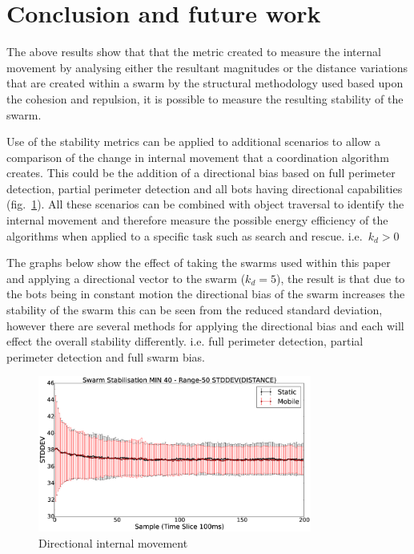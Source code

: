 \documentclass[10pt,journal,letterpaper,twoside]{IEEEtran}
\newcommand{\stability}{internal movement}
\newcommand{\Fig}{fig.}
\begin{document}
\section{Conclusion and future work\label{section:futureWork}}

The above results show that that the metric created to measure the
\stability{} by analysing either the resultant magnitudes or the
distance variations that are created within a swarm by the structural
methodology used based upon the cohesion and repulsion, it is possible
to measure the resulting stability of the swarm.

Use of the stability metrics can be applied to additional scenarios to
allow a comparison of the change in \stability{} that a coordination
algorithm creates. This could be the addition of a directional bias
based on full perimeter detection, partial perimeter detection and all
bots having directional capabilities
(\Fig{}~\ref{methods:StabilityDistanceSwarmDirection}).  All these
scenarios can be combined with object traversal to identify the
\stability{} and therefore measure the possible energy efficiency of
the algorithms when applied to a specific task such as search and
rescue. i.e.~${k_d > 0}$

The graphs below show the effect of taking the swarms used within this
paper and applying a directional vector to the swarm ($k_d = 5$), the
result is that due to the bots being in constant motion the
directional bias of the swarm increases the stability of the swarm
this can be seen from the reduced standard deviation, however there
are several methods for applying the directional bias and each will
effect the overall stability differently. i.e. full perimeter
detection, partial perimeter detection and full swarm bias.

\begin{figure}[H]
\begin{center}
\includegraphics[width=9cm]{figures/StabilityDistanceSwarmDirection}
\end{center}
\caption{Directional \stability{}\label{methods:StabilityDistanceSwarmDirection}}
\end{figure}
\end{document}
